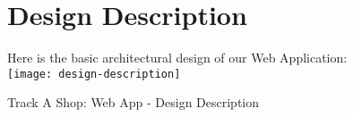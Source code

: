 \pagebreak

\begin{figure}[h]
	\section{Design Description}
	Here is the basic architectural design of our Web Application:\\
	\vspace{1.5cm}
	\centering
	\texttt{[image: design-description]}
	\caption{Track A Shop: Web App - Design Description}
\end{figure}
\pagebreak


